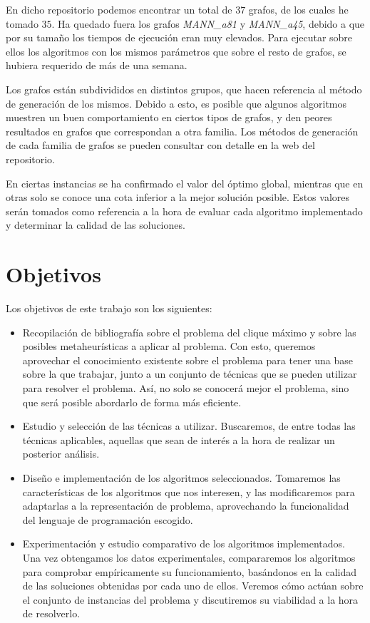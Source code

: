 En dicho repositorio podemos encontrar un total de $37$ grafos, de los cuales he tomado $35$.
Ha quedado fuera los grafos \textit{MANN\_a81} y \textit{MANN\_a45}, debido a que por su tamaño
los tiempos de ejecución eran muy elevados. Para ejecutar sobre ellos los algoritmos con los
mismos parámetros que sobre el resto de grafos, se hubiera requerido de más de una semana.

Los grafos están subdivididos en distintos grupos, que hacen referencia al método de
generación de los mismos. Debido a esto, es posible que algunos algoritmos muestren
un buen comportamiento en ciertos tipos de grafos, y den peores resultados en grafos
que correspondan a otra familia. Los métodos de generación de cada familia de grafos
se pueden consultar con detalle en la web del repositorio.

En ciertas instancias se ha confirmado el valor del óptimo global, mientras que en
otras solo se conoce una cota inferior a la mejor solución posible. Estos valores
serán tomados como referencia a la hora de evaluar cada algoritmo implementado y
determinar la calidad de las soluciones.

\section{Objetivos}
Los objetivos de este trabajo son los siguientes:

\begin{itemize}
  \item Recopilación de bibliografía sobre el problema del clique máximo y sobre
        las posibles metaheurísticas a aplicar al problema. Con esto, queremos
        aprovechar el conocimiento existente sobre el problema para tener una
        base sobre la que trabajar, junto a un conjunto de técnicas que se pueden
        utilizar para resolver el problema. Así, no solo se conocerá mejor el problema,
        sino que será posible abordarlo de forma más eficiente.

  \item Estudio y selección de las técnicas a utilizar. Buscaremos, de entre todas
        las técnicas aplicables, aquellas que sean de interés a la hora de realizar
        un posterior análisis.

  \item Diseño e implementación de los algoritmos seleccionados. Tomaremos las
        características de los algoritmos que nos interesen, y las modificaremos
        para adaptarlas a la representación de problema, aprovechando la funcionalidad
        del lenguaje de programación escogido.

  \item Experimentación y estudio comparativo de los algoritmos implementados.
        Una vez obtengamos los datos experimentales, compararemos los algoritmos
        para comprobar empíricamente su funcionamiento, basándonos en la calidad
        de las soluciones obtenidas por cada uno de ellos. Veremos cómo actúan
        sobre el conjunto de instancias del problema y discutiremos su viabilidad
        a la hora de resolverlo.
\end{itemize}

